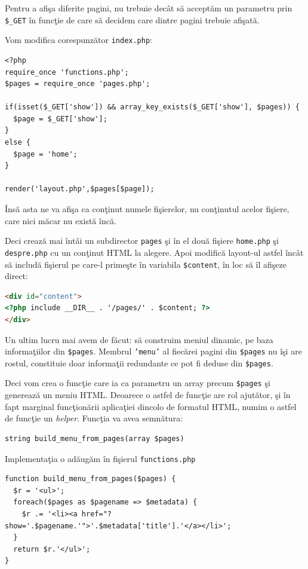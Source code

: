 Pentru a afişa diferite pagini, nu trebuie decât să acceptăm un
parametru prin \texttt{\$\_GET} în funcţie de care să
decidem care dintre pagini trebuie afişată.

Vom modifica corespunzător \texttt{index.php}:

\begin{lstlisting}[title=index.php]
<?php
require_once 'functions.php';
$pages = require_once 'pages.php';

if(isset($_GET['show']) && array_key_exists($_GET['show'], $pages)) {
  $page = $_GET['show'];
}
else {
  $page = 'home';
}

render('layout.php',$pages[$page]);
\end{lstlisting}
Însă asta ne va afişa ca conţinut numele fişierelor, nu conţinutul acelor
fişiere, care nici măcar nu există încă.

Deci crează mai întâi un subdirector \texttt{pages} şi în el două fişiere
\texttt{home.php} şi \texttt{despre.php} cu un conţinut HTML
la alegere. Apoi modifică layout-ul astfel încât să includă fişierul
pe care-l primeşte în variabila \texttt{\$content}, în loc să îl afişeze
direct:
\begin{lstlisting}[numbers=none,language=html]
<div id="content">
<?php include __DIR__ . '/pages/' . $content; ?>
</div>
\end{lstlisting}

Un ultim lucru mai avem de făcut: să construim meniul dinamic,
pe baza informaţiilor din \texttt{\$pages}. Membrul \texttt{'menu'}
al fiecărei pagini din \texttt{\$pages} nu îşi are rostul, constituie
doar informaţii redundante ce pot fi deduse din \texttt{\$pages}.

Deci vom crea o funcţie care ia ca parametru un array precum \texttt{\$pages}
şi generează un meniu HTML. Deoarece o astfel de funcţie
are rol ajutător, şi în fapt marginal funcţionării aplicaţiei
dincolo de formatul HTML, numim o astfel de funcţie un \textsl{helper}.
Funcţia va avea semnătura:
\begin{verbatim}
string build_menu_from_pages(array $pages)
\end{verbatim}
Implementaţia o adăugăm în fişierul \texttt{functions.php}
\begin{lstlisting}[numbers=none,title=functions.php]
function build_menu_from_pages($pages) {
  $r = '<ul>';
  foreach($pages as $pagename => $metadata) {
	$r .= '<li><a href="?show='.$pagename.'">'.$metadata['title'].'</a></li>';
  }
  return $r.'</ul>';
}
\end{lstlisting}

